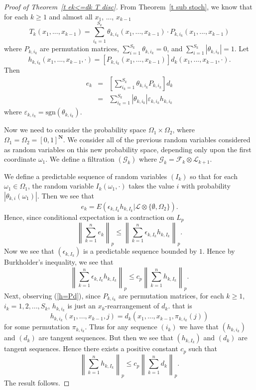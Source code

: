 \documentclass[12pt]{amsart}
\begin{document}
\begin{proof}[Proof of Theorem~\ref{t ek<=dk T disc}]
From Theorem~\ref{t sub stoch}, we know that for each $k\geq1$ and almost all
$x_1$, ..., $x_{k-1}$
\[T_k(x_1,...,x_{k-1})=\sum_{i_k=1}^{S_k} \theta _{k,i_k}(x_1,...,x_{k-1})\cdot P_{k,i_k}(x_1,...,x_{k-1})\]
where $P_{k,i_k}$ are permutation matrices, $\sum_{i=1}^{S_k}
\theta _{k,i_k}=0$, and $\sum_{i=1}^{S_k} |\theta _{k,i_k}|=1$. 
Let
\begin{equation}
\label{h=Pd}
h_{k,i_k}(x_1,...,x_{k-1},\cdot)=[P_{k,i_k}(x_1,...,x_{k-1})]d_k(x_1,...,x_{k-1},\cdot).
\end{equation}
Then
\begin{eqnarray*}
e_k& =& \left[\sum_{i_k=1}^{S_k} \theta _{k,i_k}P_{k,i_k}\right]d_k\\
&=&\sum_{i_k=1}^{S_k} |\theta _{k,i_k}|\varepsilon _{k,i_k}h_{k,i_k}
\end{eqnarray*}
where $\varepsilon_{k,i_k}= \mbox{sgn}(\theta _{k,i_k})$.

Now we need to consider the probability space 
$\Omega_1 \times \Omega_2$, where 
$\Omega_1 = \Omega_2 = [0,1]^{\mathbf N}$.
We consider all of the previous random variables considered as
random variables on this new probability space, depending only upon
the first coordinate $\omega_1$.  We define a filtration 
$(\mathcal G_k)$ where $\mathcal G_k = \mathcal F_k \otimes \mathcal L_{k+1}$.

We define a predictable sequence of random variables $(I_k)$ so that for
each $\omega_1 \in \Omega_1$, the random variable
$I_k(\omega_1,\cdot)$ takes the value $i$ with probability
$|\theta_{k,i}(\omega_1)|$.  Then we see that
\[ e_k = E(\epsilon_{k,I_k} h_{k,I_k} | 
   \mathcal L \otimes \{\emptyset,\Omega_2\}) .\]
Hence, since conditional expectation is a contraction on $L_p$
\[ 
\left\| \sum_{k=1}^n e_k \right\|_p
\le
\left\| \sum_{k=1}^n \epsilon_{k,I_k} h_{k,I_k} \right\|_p .
\]
Now we see that $(\epsilon_{k,I_k})$ is a predictable sequence
bounded by $1$.  Hence by Burkholder's inequality, we see
that
\[
\left\| \sum_{k=1}^n \epsilon_{k,I_k} h_{k,I_k} \right\|_p
\le
c_p
\left\| \sum_{k=1}^n h_{k,I_k} \right\|_p .
\]
Next, observing (\ref{h=Pd}), since $P_{k,i_k}$ are permutation
matrices, for each $k\geq1$, $i_k=1,2,...,S_k$, $h_{k,i_k}$ is
just an $x_k$-rearrangement of $d_k$. that is
\[h_{k,i_k}(x_1,...,x_{k-1},j)=d_k(x_1,...,x_{k-1},\pi_{k,i_k}(j))\]
for some permutation $\pi _{k,i_k}$. Thus for any sequence
$(i_k)$ we have that
$(h_{k,i_k})$ and
$(d_k)$ are tangent sequences.
But then we see that $(h_{k,I_k})$ and $(d_k)$ are tangent 
sequences.  Hence there
exists a positive constant $c_p$ such that
\[\left\|\sum_{k=1}^n h_{k,I_k}\right\|_p\leq
c_p \left\|\sum_{k=1}^n d_k\right\|_p . \] 
The result follows.
\end{proof}
\end{document}
